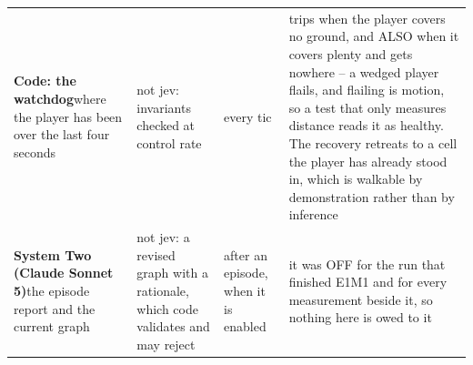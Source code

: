 \begin{longtable}{L{0.27\textwidth} L{0.21\textwidth} L{0.11\textwidth} L{0.29\textwidth}}
\textbf{Code: the watchdog}\newline where the player has been over the last four seconds & not jev: invariants checked at control rate & every tic & trips when the player covers no ground, and ALSO when it covers plenty and gets nowhere -- a wedged player flails, and flailing is motion, so a test that only measures distance reads it as healthy. The recovery retreats to a cell the player has already stood in, which is walkable by demonstration rather than by inference \\ \rowrule
\textbf{System Two (Claude Sonnet 5)}\newline the episode report and the current graph & not jev: a revised graph with a rationale, which code validates and may reject & after an episode, when it is enabled & it was OFF for the run that finished E1M1 and for every measurement beside it, so nothing here is owed to it \\
\end{longtable}
\endgroup

